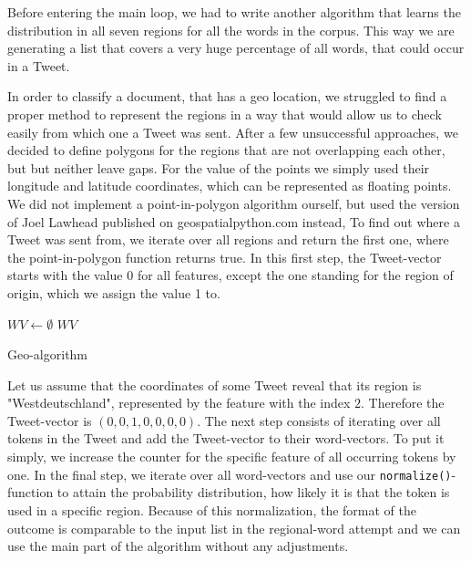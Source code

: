 \documentclass[../Main.tex]{subfiles}
\begin{document}
Before entering the main loop, we had to write another algorithm that learns the distribution in all seven regions for all the words in the corpus. This way we are generating a list that covers a very huge percentage of all words, that could occur in a Tweet.

In order to classify a document, that has a geo location, we struggled to find a proper method to represent the regions in a way that would allow us to check easily from which one a Tweet was sent. After a few unsuccessful approaches, we decided to define polygons for the regions that are not overlapping each other, but but neither leave gaps. For the value of the points we simply used their longitude and latitude coordinates, which can be represented as floating points.  
We did not implement a point-in-polygon algorithm ourself, but used the version of Joel Lawhead published on geospatialpython.com \cite{GeoPy} instead,  
To find out  where a Tweet was sent from, we iterate over all regions and return the first one, where the point-in-polygon function returns true.
In this first step, the Tweet-vector starts with the value 0 for all features, except the one standing for the region of origin, which we assign the value 1 to.

\begin{algorithm}[!b]
 \SetAlgoLined
 $WV \gets\emptyset $\; 
\Return $WV$\;
\label{geo-algo}
\caption{Geo-algorithm}
\end{algorithm}

Let us assume that the coordinates of some Tweet reveal that its region is "Westdeutschland", represented by the feature with the index $2$.
Therefore the Tweet-vector is $(0,0,1,0,0,0,0)$. 
The next step consists of iterating over all tokens in the Tweet and add the Tweet-vector to their word-vectors. To put it simply, we increase the counter for the specific feature of all occurring tokens by one. 
In the final step, we iterate over all word-vectors and use our \texttt{normalize()}-function to attain the probability distribution, how likely it is that the token is used in a specific region. Because of this normalization, the format of the outcome is comparable to the input list in the regional-word attempt and we can use the main part of the algorithm without any adjustments.
\end{document}

